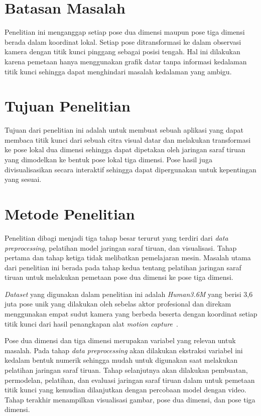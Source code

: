 \section{Batasan Masalah}
\label{sec:1-BatasMasalah}

Penelitian ini menganggap setiap pose dua dimensi maupun pose tiga dimensi berada dalam koordinat
lokal. Setiap pose ditransformasi ke dalam observasi kamera dengan titik kunci pinggang
sebagai posisi tengah. Hal ini dilakukan karena pemetaan hanya menggunakan grafik datar tanpa
informasi kedalaman titik kunci sehingga dapat menghindari masalah kedalaman yang ambigu.

\section{Tujuan Penelitian}
\label{sec:1-TujuanPenelitian}

Tujuan dari penelitian ini adalah untuk membuat sebuah aplikasi yang dapat membaca titik kunci dari
sebuah citra visual datar dan melakukan transformasi ke pose lokal dua dimensi sehingga dapat
dipetakan oleh jaringan saraf tiruan yang dimodelkan ke bentuk pose lokal tiga dimensi. Pose hasil
juga divisualisasikan secara interaktif sehingga dapat dipergunakan untuk kepentingan yang sesuai.

\section{Metode Penelitian}
\label{sec:1-MetodePenelitian}

Penelitian dibagi menjadi tiga tahap besar terurut yang terdiri dari \textit{data preprocessing},
pelatihan model jaringan saraf tiruan, dan visualisasi. Tahap pertama dan tahap ketiga tidak
melibatkan pemelajaran mesin. Masalah utama dari penelitian ini berada pada tahap kedua tentang
pelatihan jaringan saraf tiruan untuk melakukan pemetaan pose dua dimensi ke pose tiga dimensi.

\textit{Dataset} yang digunakan dalam penelitian ini adalah \textit{Human3.6M} yang berisi 3,6 juta
pose unik yang dilakukan oleh sebelas aktor profesional dan direkam menggunakan empat sudut kamera
yang berbeda beserta dengan koordinat setiap titik kunci dari hasil penangkapan alat
\textit{motion capture}~\cite{h36m_pami}.

Pose dua dimensi dan tiga dimensi merupakan variabel yang relevan untuk masalah. Pada tahap
\textit{data preprocessing} akan dilakukan ekstraksi variabel ini kedalam bentuk numerik sehingga
mudah untuk digunakan saat melakukan pelatihan jaringan saraf tiruan. Tahap selanjutnya akan
dilakukan pembuatan, permodelan, pelatihan, dan evaluasi jaringan saraf tiruan dalam untuk
pemetaan titik kunci yang kemudian dilanjutkan dengan percobaan model dengan video. Tahap terakhir
menampilkan visualisasi gambar, pose dua dimensi, dan pose tiga dimensi.

